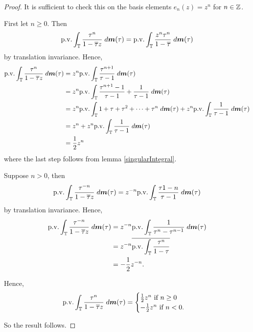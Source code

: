 \begin{proof}
    It is sufficient to check this on the basis elements $e_n(z) = z^n$ for $n \in \mathbb{Z}$.
    
    First let $n \geq 0$. Then
    \begin{equation*}
        \mathrm{p.v.}\int_{\mathbb{T}} \frac{\tau^n}{1-\overline{\tau}z}\;d\boldsymbol{m}(\tau) = \mathrm{p.v.}\int_{\mathbb{T}} \frac{z^n\tau^n}{1-\overline{\tau}}\;d\boldsymbol{m}(\tau)
    \end{equation*}
    by translation invariance.
    Hence,
    \begin{align*}
        \mathrm{p.v.}\int_{\mathbb{T}} \frac{\tau^n}{1-\overline{\tau}z}\;d\boldsymbol{m}(\tau) &= z^n\mathrm{p.v.}\int_{\mathbb{T}} \frac{\tau^{n+1}}{\tau-1}\;d\boldsymbol{m}(\tau) \\
        &= z^n \mathrm{p.v.}\int_{\mathbb{T}} \frac{\tau^{n+1}-1}{\tau-1}+\frac{1}{\tau-1}\;d\boldsymbol{m}(\tau)\\
        &= z^n \mathrm{p.v.}\int_{\mathbb{T}} 1+\tau+\tau^2+\cdots+\tau^{n}\;d\boldsymbol{m}(\tau)+z^n\mathrm{p.v.}\int_{\mathbb{T}} \frac{1}{\tau-1}\;d\boldsymbol{m}(\tau)\\
        &= z^n + z^n\mathrm{p.v.}\int_{\mathbb{T}} \frac{1}{\tau-1}\;d\boldsymbol{m}(\tau)\\
        &= \frac{1}{2}z^n
    \end{align*}
    where the last step follows from lemma \ref{singularIntegral}.
    
    Suppose $n > 0$, then
    \begin{equation*}
        \mathrm{p.v.}\int_{\mathbb{T}} \frac{\tau^{-n}}{1-\overline{\tau}z}\;d\boldsymbol{m}(\tau) = z^{-n} \mathrm{p.v.}\int_{\mathbb{T}} \frac{\tau{1-n}}{\tau-1}\;d\boldsymbol{m}(\tau)
    \end{equation*}
    by translation invariance. Hence,
    \begin{align*}
        \mathrm{p.v.}\int_{\mathbb{T}} \frac{\tau^{-n}}{1-\overline{\tau}z}\;d\boldsymbol{m}(\tau) &= z^{-n} \mathrm{p.v.} \int_{\mathbb{T}} \frac{1}{\tau^n-\tau^{n-1}}\;d\boldsymbol{m}(\tau)\\
        &= z^{-n}\overline{\mathrm{p.v.}\int_{\mathbb{T}} \frac{\tau^n}{1-\tau}}\\
        &= -\frac{1}{2}z^{-n}.
    \end{align*}
    
    Hence, 
    \begin{equation*}
        \mathrm{p.v.}\int_{\mathbb{T}} \frac{\tau^n}{1-\overline{\tau}z}\;d\boldsymbol{m}(\tau) = \begin{cases}
            \frac{1}{2}z^n\text{ if }n \geq 0\\
            -\frac{1}{2}z^n\text{ if }n < 0.
        \end{cases}
    \end{equation*}
    
    So the result follows.
    
\end{proof}

